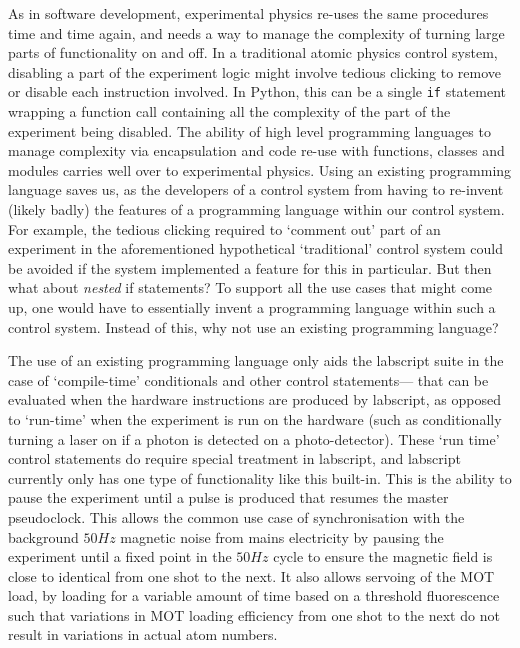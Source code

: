 As in software development, experimental physics re-uses the same procedures time and time again, and needs a way to manage the complexity of turning large parts of functionality on and off. In a traditional atomic physics control system, disabling a part of the experiment logic might involve tedious clicking to remove or disable each instruction involved. In Python, this can be a single \texttt{if} statement wrapping a function call containing all the complexity of the part of the experiment being disabled. The ability of high level programming languages to manage complexity via encapsulation and code re-use with functions, classes and modules carries well over to experimental physics. Using an existing programming language saves us, as the developers of a control system from having to re-invent (likely badly) the features of a programming language within our control system. For example, the tedious clicking required to `comment out' part of an experiment in the aforementioned hypothetical `traditional' control system could be avoided if the system implemented a feature for this in particular. But then what about \emph{nested} if statements? To support all the use cases that might come up, one would have to essentially invent a programming language within such a control system. Instead of this, why not use an existing programming language?

The use of an existing programming language only aids the labscript suite in the case of `compile-time' conditionals and other control statements--- that can be evaluated when the hardware instructions are produced by labscript, as opposed to `run-time' when the experiment is run on the hardware (such as conditionally turning a laser on if a photon is detected on a photo-detector). These `run time' control statements do require special treatment in labscript, and labscript currently only has one type of functionality like this built-in. This is the ability to pause the experiment until a pulse is produced that resumes the master pseudoclock. This allows the common use case of synchronisation with the background $50\unit{Hz}$ magnetic noise from mains electricity by pausing the experiment until a fixed point in the $50\unit{Hz}$ cycle to ensure the magnetic field is close to identical from one shot to the next. It also allows servoing of the MOT load, by loading for a variable amount of time based on a threshold fluorescence such that variations in MOT loading efficiency from one shot to the next do not result in variations in actual atom numbers.

